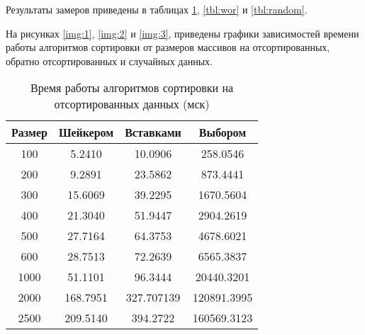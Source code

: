 Результаты замеров приведены в таблицах \ref{tbl:best}, \ref{tbl:wor} и \ref{tbl:random}.

На рисунках \ref{img:1}, \ref{img:2} и \ref{img:3}, приведены графики зависимостей времени работы алгоритмов сортировки от размеров массивов на отсортированных, обратно отсортированных и случайных данных.



\begin{table}[h]
	\begin{center}
		\caption{Время работы алгоритмов сортировки на отсортированных данных (мск)}
		\label{tbl:best}
		\begin{tabular}{|c|c|c|c|}
			\hline
			 Размер & Шейкером &  Вставками &  Выбором \\
			\hline
			100 & 5.2410 & 10.0906 & 258.0546\\
			\hline
			200 & 9.2891 & 23.5862 & 873.4441\\
			\hline
			300 & 15.6069 & 39.2295 & 1670.5604 \\
			\hline
			400 & 21.3040 & 51.9447 & 2904.2619 \\
			\hline
			500 & 27.7164 & 64.3753 & 4678.6021 \\
			\hline
			600 & 28.7513 & 72.2639 & 6565.3837 \\
			\hline
			1000 & 51.1101 & 96.3444 & 20440.3201 \\
			\hline
			2000 & 168.7951 & 327.707139 & 120891.3995 \\
			\hline
			2500 & 209.5140 & 394.2722 & 160569.3123 \\
			\hline
		\end{tabular}
	\end{center}
	
\end{table}
\clearpage



